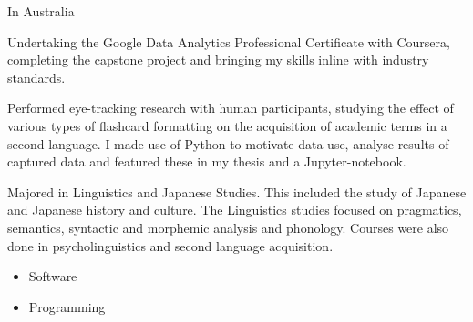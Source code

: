 \documentclass[10pt,a4paper,ragged2e,withhyper]{altacv}
\begin{document}
\begin{paracol}{2}
\label{sec:org00d7da6}
In Australia
\switchcolumn

\label{sec:orgb96af70}




{}
\label{sec:org8d55d18}
Undertaking the Google Data Analytics Professional Certificate with Coursera, completing the capstone project and bringing my skills inline with industry standards.
\par\divider
{}
Performed eye-tracking research with human participants, studying the effect of various types of flashcard formatting on the acquisition of academic terms in a second language. I made use of Python to motivate data use, analyse results of captured data and featured these in my thesis and a Jupyter-notebook.
\par\divider
{}
Majored in Linguistics and Japanese Studies. This included the study of Japanese and Japanese history and culture. The Linguistics studies focused on pragmatics, semantics, syntactic and morphemic analysis and phonology. Courses were also done in psycholinguistics and second language acquisition.

\label{sec:orgf9c95a3}
\begin{itemize}
\item Software
\end{itemize}
\begin{itemize}
\item Programming
\end{itemize}
\cvtag{\LaTeX}

\end{paracol}
\end{document}
